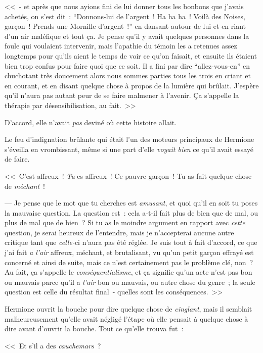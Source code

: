 <<~- et après que nous ayions fini de lui donner tous les bonbons que j'avais achetés, on s'est dit~: “Donnons-lui de l'argent~! Ha ha ha~! Voilà des Noises, garçon~! Prends une Mornille d'argent~!” en dansant autour de lui et en riant d'un air maléfique et tout ça. Je pense qu'il y avait quelques personnes dans la foule qui voulaient intervenir, mais l'apathie du témoin les a retenues assez longtemps pour qu'ils aient le temps de voir ce qu'on faisait, et ensuite ils étaient bien trop confus pour faire quoi que ce soit. Il a fini par dire “allez-vous-en” en chuchotant très doucement alors nous sommes parties tous les trois en criant et en courant, et en disant quelque chose à propos de la lumière qui brûlait. J'espère qu'il n'aura pas autant peur de se faire malmener à l'avenir. Ça s'appelle la thérapie par désensibilisation, au fait.~>>

D'accord, elle n'avait \emph{pas} deviné où cette histoire allait.

Le feu d'indignation brûlante qui était l'un des moteurs principaux de Hermione s'éveilla en vrombissant, même si une part d'elle \emph{voyait bien} ce qu'il avait essayé de faire.

<<~C'est affreux~! \emph{Tu} es affreux~! Ce pauvre garçon~! Tu as fait quelque chose de \emph{méchant}~!

--- Je pense que le mot que tu cherches est \emph{amusant}, et quoi qu'il en soit tu poses la mauvaise question. La question est~: cela a-t-il fait plus de bien que de mal, ou plus de mal que de bien~? Si tu as le moindre argument en rapport avec \emph{cette} question, je serai heureux de l'entendre, mais je n'accepterai aucune autre critique tant que \emph{celle-}ci n'aura pas été réglée. Je suis tout à fait d'accord, ce que j'ai fait \emph{a l'air} affreux, méchant, et brutalisant, vu qu'un petit garçon effrayé est concerné et ainsi de suite, mais ce n'est certainement pas le problème clé, non~? Au fait, ça s'appelle le \emph{conséquentialisme}, et ça signifie qu'un acte n'est pas bon ou mauvais parce qu'il a \emph{l'air} bon ou mauvais, ou autre chose du genre~; la seule question est celle du résultat final~- quelles sont les conséquences.~>>

Hermione ouvrit la bouche pour dire quelque chose de \emph{cinglant}, mais il semblait malheureusement qu'elle avait négligé l'étape où elle pensait à quelque chose à dire avant d'ouvrir la bouche. Tout ce qu'elle trouva fut~:

<<~Et s'il a des \emph{cauchemars}~?

